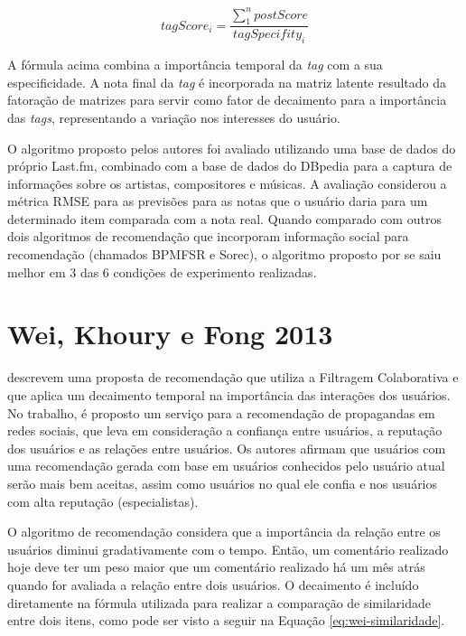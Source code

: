 \begin{equation}
  \label{eq:kushwaha-nota-final}
  tagScore_i = \frac{\sum_1^n{postScore}}{tagSpecifity_i}
\end{equation}

A fórmula acima combina a importância temporal da \textit{tag} com a sua especificidade. A nota final da \textit{tag}
é incorporada na matriz latente resultado da fatoração de matrizes para servir como fator de decaimento para a importância
das \textit{tags}, representando a variação nos interesses do usuário.

O algoritmo proposto pelos autores foi avaliado utilizando uma base de dados do próprio Last.fm, combinado com a base de
dados do DBpedia para a captura de informações sobre os artistas, compositores e músicas. A avaliação considerou a
métrica RMSE para as previsões para as notas que o usuário daria para um determinado
item comparada com a nota real. Quando comparado com outros dois algoritmos de recomendação que incorporam
informação social para recomendação (chamados BPMFSR e Sorec), o algoritmo proposto por  se saiu melhor em 3
das 6 condições de experimento realizadas.

\section{Wei, Khoury e Fong 2013}

 descrevem uma proposta de recomendação que utiliza a Filtragem Colaborativa e que aplica um
decaimento temporal na importância das interações dos usuários. No trabalho, é proposto um serviço para a recomendação
de propagandas em redes sociais, que leva em consideração a confiança entre usuários, a reputação dos usuários e as
relações entre usuários. Os autores afirmam que usuários com uma recomendação gerada com base em usuários conhecidos
pelo usuário atual serão mais bem aceitas, assim como usuários no qual ele confia e nos usuários com alta reputação
(especialistas).

O algoritmo de recomendação considera que a importância da relação entre os usuários diminui gradativamente com o tempo.
Então, um comentário realizado hoje deve ter um peso maior que um comentário realizado há um mês atrás quando for
avaliada a relação entre dois usuários. O decaimento é incluído diretamente na fórmula utilizada para realizar a
comparação de similaridade entre dois itens, como pode ser visto a seguir na Equação \ref{eq:wei-similaridade}.


